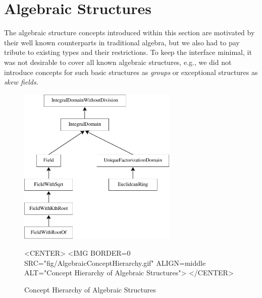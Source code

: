 
\section{Algebraic Structures}


The algebraic structure concepts introduced within this section are 
motivated by their well known counterparts in traditional algebra, 
but we also had to pay tribute to existing types and their restrictions. 
To keep the interface minimal,
it was not desirable to cover all known algebraic structures, 
e.g., we did not introduce concepts for such basic structures as {\em groups} or
exceptional structures as {\em skew fields}. 

\begin{figure}[htbp]
\begin{ccTexOnly}
\begin{center}
\includegraphics[width=3in]{Algebraic_foundations/fig/AlgebraicConceptHierarchy}
\end{center}
\end{ccTexOnly}


\begin{ccHtmlOnly}
<CENTER>
<IMG BORDER=0 SRC="fig/AlgebraicConceptHierarchy.gif" 
 ALIGN=middle ALT="Concept Hierarchy of Algebraic Structures">
</CENTER>
\end{ccHtmlOnly}

\caption{Concept Hierarchy of Algebraic Structures
\label{fig::ConceptHierarchyOfAlgebraicStructures}}
\end{figure}

